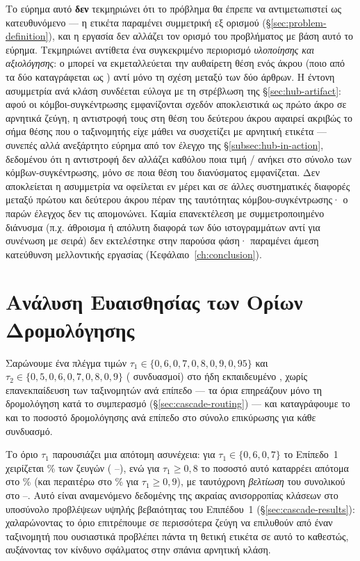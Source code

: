 Το εύρημα αυτό \textbf{δεν} τεκμηριώνει ότι το πρόβλημα θα έπρεπε να
αντιμετωπιστεί ως κατευθυνόμενο --- η ετικέτα παραμένει συμμετρική εξ ορισμού
(\S\ref{sec:problem-definition}), και η εργασία δεν αλλάζει τον ορισμό του
προβλήματος με βάση αυτό το εύρημα.
Τεκμηριώνει αντίθετα ένα συγκεκριμένο
περιορισμό \textit{υλοποίησης και αξιολόγησης}: ο \texttt{}
μπορεί να εκμεταλλεύεται την αυθαίρετη θέση ενός άκρου (ποιο από τα δύο
καταγράφεται ως \texttt{}) αντί μόνο τη σχέση μεταξύ των δύο άρθρων.
Η έντονη ασυμμετρία ανά κλάση συνδέεται εύλογα με τη στρέβλωση της
\S\ref{sec:hub-artifact}: αφού οι κόμβοι-συγκέντρωσης εμφανίζονται σχεδόν
αποκλειστικά ως πρώτο άκρο σε αρνητικά ζεύγη, η αντιστροφή τους στη θέση του
δεύτερου άκρου αφαιρεί ακριβώς το σήμα θέσης που ο ταξινομητής είχε μάθει να
συσχετίζει με αρνητική ετικέτα --- συνεπές αλλά ανεξάρτητο εύρημα από τον
έλεγχο της \S\ref{subsec:hub-in-action}, δεδομένου ότι η αντιστροφή δεν
αλλάζει καθόλου ποια τιμή \texttt{}/\texttt{} ανήκει στο σύνολο
των κόμβων-συγκέντρωσης, μόνο σε ποια θέση του διανύσματος 
εμφανίζεται.
Δεν αποκλείεται η ασυμμετρία να οφείλεται εν μέρει και σε άλλες
συστηματικές διαφορές μεταξύ πρώτου και δεύτερου άκρου πέραν της ταυτότητας
κόμβου-συγκέντρωσης· ο παρών έλεγχος δεν τις απομονώνει.
Καμία επανεκτέλεση με συμμετροποιημένο διάνυσμα  (π.χ. άθροισμα ή
απόλυτη διαφορά των δύο ιστογραμμάτων αντί για συνένωση με σειρά) δεν
εκτελέστηκε στην παρούσα φάση· παραμένει άμεση κατεύθυνση μελλοντικής εργασίας
(Κεφάλαιο~\ref{ch:conclusion}).


\section{Ανάλυση Ευαισθησίας των Ορίων Δρομολόγησης}
\label{sec:ablation}

Σαρώνουμε ένα πλέγμα τιμών $\tau_1 \in \{0{,}6, 0{,}7, 0{,}8, 0{,}9, 0{,}95\}$ και
$\tau_2 \in \{0{,}5, 0{,}6, 0{,}7, 0{,}8, 0{,}9\}$ (\AblGridPoints{} συνδυασμοί) στο ήδη εκπαιδευμένο
, χωρίς επανεκπαίδευση των ταξινομητών ανά επίπεδο --- τα όρια
επηρεάζουν μόνο τη δρομολόγηση κατά το συμπερασμό (\S\ref{sec:cascade-routing}) --- και
καταγράφουμε το  και το ποσοστό δρομολόγησης ανά επίπεδο στο σύνολο
επικύρωσης για κάθε συνδυασμό.

Το όριο $\tau_1$ παρουσιάζει μια απότομη ασυνέχεια: για $\tau_1 \in \{0{,}6, 0{,}7\}$
το Επίπεδο~1 χειρίζεται \AblTierOneLowPct\% των ζευγών ( \AblTierOneLowFone{}--\AblTierOneHighFone), ενώ
για $\tau_1 \geq 0{,}8$ το ποσοστό αυτό καταρρέει απότομα στο \AblTierOneBreakPct\% (και περαιτέρω
στο \AblTierOneBreakPctHigh\% για $\tau_1 \geq 0{,}9$), με ταυτόχρονη \textit{βελτίωση} του συνολικού
 στο \AblHighTauOneLowFone{}--\AblBestFone.
Αυτό είναι αναμενόμενο δεδομένης της ακραίας
ανισορροπίας κλάσεων στο υποσύνολο προβλέψεων υψηλής βεβαιότητας του Επιπέδου~1
(\S\ref{sec:cascade-results}): χαλαρώνοντας το όριο επιτρέπουμε σε περισσότερα ζεύγη
να επιλυθούν από έναν ταξινομητή που ουσιαστικά προβλέπει πάντα τη θετική ετικέτα σε
αυτό το καθεστώς, αυξάνοντας τον κίνδυνο σφάλματος στην σπάνια αρνητική κλάση.

